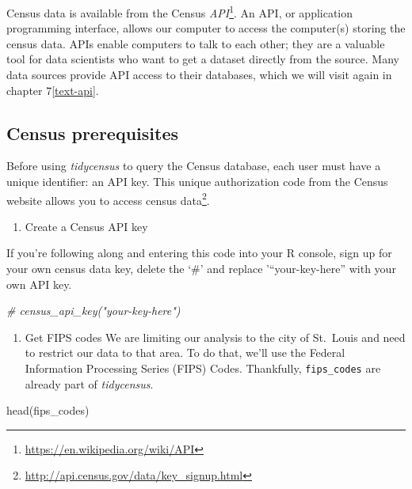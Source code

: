 \documentclass[
  krantz2]{krantz}
\makeatletter
\newenvironment{Shaded}{\begin{snugshade}}{\end{snugshade}}
\newcommand{\CommentTok}[1]{\textcolor[rgb]{0.37,0.37,0.37}{\textit{#1}}}
\newcommand{\FunctionTok}[1]{\textcolor[rgb]{0,0,0}{#1}}
\newcommand{\NormalTok}[1]{#1}
\providecommand{\tightlist}{%
  \setlength{\itemsep}{0pt}\setlength{\parskip}{0pt}}
\newenvironment{kframe}{%
\medskip{}
\setlength{\fboxsep}{.8em}
 \def\at@end@of@kframe{}%
 \ifinner\ifhmode%
  \def\at@end@of@kframe{\end{minipage}}%
  \begin{minipage}{\columnwidth}%
 \fi\fi%
 \def\FrameCommand##1{\hskip\@totalleftmargin \hskip-\fboxsep
 \colorbox{shadecolor}{##1}\hskip-\fboxsep
     \hskip-\linewidth \hskip-\@totalleftmargin \hskip\columnwidth}%
 \MakeFramed {\advance\hsize-\width
   \@totalleftmargin\z@ \linewidth\hsize
   \@setminipage}}%
 {\par\unskip\endMakeFramed%
 \at@end@of@kframe}
\renewenvironment{Shaded}{\begin{kframe}}{\end{kframe}}
\makeatother
\begin{document}
Census data is available from the Census \emph{API}\footnote{\url{https://en.wikipedia.org/wiki/API}}. An API, or application programming interface, allows our computer to access the computer(s) storing the census data. APIs enable computers to talk to each other; they are a valuable tool for data scientists who want to get a dataset directly from the source. Many data sources provide API access to their databases, which we will visit again in chapter 7\ref{text-api}.

\hypertarget{census-prerequisites}{%
\subsection{Census prerequisites}\label{census-prerequisites}}

Before using \emph{tidycensus} to query the Census database, each user must have a unique identifier: an API key. This unique authorization code from the Census website allows you to access census data\footnote{\url{http://api.census.gov/data/key_signup.html}}.

\begin{enumerate}
\def\labelenumi{\arabic{enumi}.}
\tightlist
\item
  Create a Census API key
\end{enumerate}

If you're following along and entering this code into your R console, sign up for your own census data key, delete the `\#' and replace '``your-key-here'' with your own API key.

\begin{Shaded}
\begin{Highlighting}[]
\CommentTok{\# census\_api\_key("your{-}key{-}here") }
\end{Highlighting}
\end{Shaded}

\begin{enumerate}
\def\labelenumi{\arabic{enumi}.}
\setcounter{enumi}{1}
\tightlist
\item
  Get FIPS codes
  We are limiting our analysis to the city of St.~Louis and need to restrict our data to that area. To do that, we'll use the Federal Information Processing Series (FIPS) Codes. Thankfully, \texttt{fips\_codes} are already part of \emph{tidycensus}.
\end{enumerate}

\begin{Shaded}
\begin{Highlighting}[]
\FunctionTok{head}\NormalTok{(fips\_codes)}
\end{Highlighting}
\end{Shaded}
\end{document}
